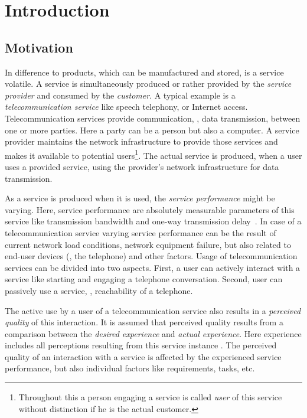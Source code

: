 \chapter{Introduction}\label{chap:01}

\section{Motivation}
In difference to products, which can be manufactured and stored, is a service volatile.
A service is simultaneously produced or rather provided by the \emph{service provider} and consumed by the \emph{customer}.
A typical example is a \emph{telecommunication service} like speech telephony, or Internet access.
Telecommunication services provide communication, \ie, data transmission, between one or more parties.
Here a party can be a person but also a computer.
A service provider maintains the network infrastructure to provide those services and makes it available to potential users\footnote{Throughout this a person engaging a service is called \emph{user} of this service without distinction if he is the actual customer.}.
The actual service is produced, when a user uses a provided service, using the provider's network infrastructure for data transmission.

As a service is produced when it is used, the \emph{service performance} might be varying.
Here, service performance are absolutely measurable parameters of this service like transmission bandwidth and one-way transmission delay~\citep[\cf,][p. 12]{moller_assessment_2000}.
In case of a telecommunication service varying service performance can be the result of current network load conditions, network equipment failure, but also related to end-user devices (\eg, the telephone) and other factors.
Usage of telecommunication services can be divided into two aspects.
First, a user can actively interact with a service like starting and engaging a telephone conversation.
Second, user can passively use a service, \eg, reachability of a telephone.

The active use by a user of a telecommunication service also results in a \emph{perceived quality} of this interaction.
It is assumed that perceived quality results from a comparison between the \emph{desired experience} and \emph{actual experience}. %
Here experience includes all perceptions resulting from this service instance \citep[\cf,][p.13]{Book chapter 2}.
The perceived quality of an interaction with a service is affected by the experienced service performance, but also individual factors like requirements, tasks, etc.

